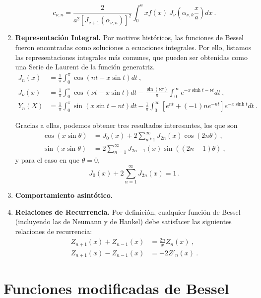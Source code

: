 \begin{enumerate}
\begin{equation}
        c_{\nu, n} = \frac{2}{a^2 \left[J_{\nu+1}(\alpha_{\nu, n})\right]^2} \int_0^a x f(x) \ J_\nu\left( \alpha_{\nu, k} \frac{x}{a} \right) dx \ .
    \end{equation}
    \item \textbf{Representación Integral.} Por motivos históricos, las funciones de Bessel fueron encontradas como soluciones a ecuaciones integrales. Por ello, listamos las representaciones integrales más comunes, que pueden ser obtenidas como una Serie de Laurent de la función generatriz.
    \begin{align}
        J_n(x) & = \frac{1}{\pi}\int_0^\pi \cos(nt - x\sin t) dt \ , \\
        J_\nu(x) & = \frac{1}{\pi} \int_0^\pi \cos(\nu t - x\sin t) dt - \frac{\sin(\nu \pi)}{\pi} \int_0^\infty e^{-x \sinh t - \nu t} dt \ , \\
        Y_n(X) & = \frac{1}{\pi} \int_0^\pi \sin(x\sin t - nt) dt - \frac{1}{\pi} \int_0^\infty \left[e^{nt} + (-1)n e^{-nt} \right] e^{-x \sinh t} dt \ .
    \end{align}

    Gracias a ellas, podemos obtener tres resultados interesantes, los que son 
    \begin{align}
        \cos(x \sin \theta) & = J_0(x) + 2 \sum_{n*1}^\infty J_{2n}(x) \cos(2n\theta) \ , \\
        \sin(x \sin \theta) & = 2 \sum_{n=1}^\infty J_{2n-1}(x) \sin((2n-1)\theta) \ ,
    \end{align}
    y para el caso en que $\theta = 0$, 
    \begin{equation}
        J_0(x) + 2\sum_{n=1}^\infty J_{2n}(x) = 1 \ .
    \end{equation}
    \item \textbf{Comportamiento asintótico.}
    \item \textbf{Relaciones de Recurrencia.} Por definición, cualquier función de Bessel (incluyendo las de Neumann y de Hankel) debe satisfacer las siguientes relaciones de recurrencia:
    \begin{align}
        Z_{n+1}(x) + Z_{n-1}(x) & = \frac{2n}{x} Z_n(x) \ , \\
        Z_{n+1}(x) - Z_{n-1}(x) & = -2 Z'_n(x) \ . 
    \end{align}
\end{enumerate}


\section{Funciones modificadas de Bessel}


